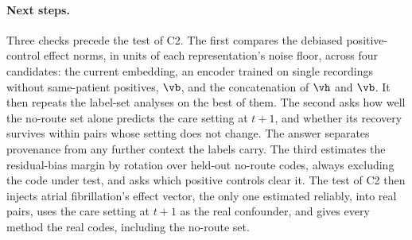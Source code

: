 \paragraph{Next steps.} Three checks precede the test of C2. The first compares the debiased positive-control effect norms, in units of each representation's noise floor, across four candidates: the current embedding, an encoder trained on single recordings without same-patient positives, $\vb$, and the concatenation of $\vh$ and $\vb$. It then repeats the label-set analyses on the best of them. The second asks how well the no-route set alone predicts the care setting at $t+1$, and whether its recovery survives within pairs whose setting does not change. The answer separates provenance from any further context the labels carry. The third estimates the residual-bias margin by rotation over held-out no-route codes, always excluding the code under test, and asks which positive controls clear it. The test of C2 then injects atrial fibrillation's effect vector, the only one estimated reliably, into real pairs, uses the care setting at $t+1$ as the real confounder, and gives every method the real codes, including the no-route set.
